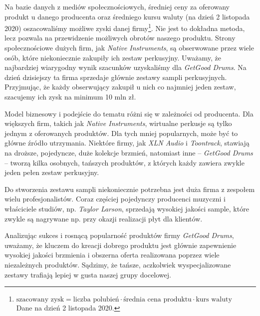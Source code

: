 \documentclass[12pt]{article}
\begin{document}
Na bazie danych z mediów społecznościowych, średniej ceny za oferowany produkt u danego producenta oraz średniego kursu waluty (na dzień 2 listopada 2020) oszacowaliśmy możliwe zyski danej firmy\footnote{$\text{szacowany zysk} = \text{liczba polubień} \cdot \text{średnia cena produktu} \cdot \text{kurs waluty}$ \\ Dane na dzień 2 listopada 2020.\label{footnote:income}}.
Nie jest to dokładna metoda, lecz pozwala na przewidzenie możliwych obrotów naszego produktu.
Strony społecznościowe dużych firm, jak \textit{Native Instruments}, są obserwowane przez wiele osób, które niekoniecznie zakupiły ich zestaw perkusyjny.
Uważamy, że najbardziej wiarygodny wynik szacunków uzyskaliśmy dla \textit{GetGood Drums}.
Na dzień dzisiejszy ta firma sprzedaje głównie zestawy sampli perkusyjnych.
Przyjmując, że każdy obserwujący zakupił u nich co najmniej jeden zestaw, szacujemy ich zysk na minimum 10 mln zł.

Model biznesowy i podejście do tematu różni się w zależności od producenta.
Dla większych firm, takich jak \textit{Native Instruments}, wirtualne perkusje są tylko jednym z oferowanych produktów.
Dla tych mniej popularnych, może być to główne źródło utrzymania.
Niektóre firmy, jak \textit{XLN Audio} i \textit{Toontrack}, stawiają na droższe, pojedyncze, duże kolekcje brzmień, natomiast inne -- \textit{GetGood Drums} -- tworzą kilka osobnych, tańszych produktów, z których każdy zawiera zwykle jeden pełen zestaw perkusyjny.

Do stworzenia zestawu sampli niekoniecznie potrzebna jest duża firma z zespołem wielu profesjonalistów.
Coraz częściej pojedynczy producenci muzyczni i właściciele studiów, np. \textit{Taylor Larson}, sprzedają wysokiej jakości sample, które zwykle są nagrywane np. przy okazji realizacji płyt dla klientów.

Analizując sukces i rosnącą popularność produktów firmy \textit{GetGood Drums}, uważamy, że kluczem do kreacji dobrego produktu jest głównie zapewnienie wysokiej jakości brzmienia i obszerna oferta realizowana poprzez wiele niezależnych produktów. Sądzimy, że tańsze, aczkolwiek wyspecjalizowane zestawy trafiają lepiej w gusta naszej grupy docelowej.
\end{document}
